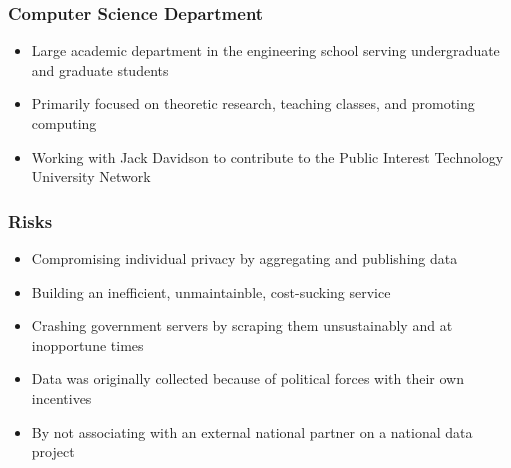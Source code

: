 \documentclass{beamer}
\begin{document}
\begin{frame}
\frametitle{Computer Science Department}
\begin{itemize}
    \item Large academic department in the engineering school serving undergraduate and graduate students
    \item Primarily focused on theoretic research, teaching classes, and promoting computing
    \item Working with Jack Davidson to contribute to the Public Interest Technology University Network
\end{itemize}
\end{frame}

\begin{frame}
\frametitle{Risks}
\begin{itemize}
    \item Compromising individual privacy by aggregating and publishing data 
    \item Building an inefficient, unmaintainble, cost-sucking service
    \item Crashing government servers by scraping them unsustainably and at inopportune times
    \item Data was originally collected because of political forces with their own incentives
    \item By not associating with an external national partner on a national data project
\end{itemize}
\end{frame}
 
\end{document}
